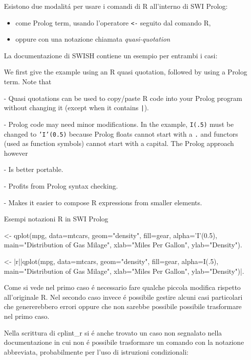 \documentclass[10pt,titlepage,twoside,a4paper]{report}
\newenvironment{code}{\singlespacing\captionsetup{type=listing}}{}
\begin{document}
Esistono due modalit\'a per usare i comandi di R all'interno di SWI Prolog:
\begin{itemize}
    \item come Prolog term, usando l'operatore \texttt{<-} seguito dal comando R,
    \item oppure con una notazione chiamata \emph{quasi-quotation}
\end{itemize}
La documentazione di SWISH contiene un esempio per entrambi i 
casi\cite{rprolognotations}:
\begin{displayquote}
[..] We first give the example using an R quasi quotation, followed by 
using a Prolog term.  Note that

  - Quasi quotations can be used to copy/paste R code into your Prolog
    program without changing it (except when it contains \texttt{|{\textbraceright}}).

  - Prolog code may need minor modifications.  In the example, \texttt{I(.5)}
    must be changed to \texttt{'I'(0.5)} because Prolog floats cannot start with
    a \texttt{.} and functors (used as function symbols) cannot start with a
    capital.  The Prolog approach however

    - Is better portable.

    - Profits from Prolog syntax checking.

    - Makes it easier to compose R expressions from smaller elements.
\end{displayquote}

\begin{code}
    \caption{Esempi notazioni R in SWI Prolog}
    \begin{prologcode*}{}
<- qplot(mpg, data=mtcars, geom="density", fill=gear, alpha='I'(0.5), main="Distribution of Gas Milage", xlab="Miles Per Gallon", ylab="Density").

<- {|r||qplot(mpg, data=mtcars, geom="density", fill=gear, alpha=I(.5), main="Distribution of Gas Milage", xlab="Miles Per Gallon", ylab="Density")|}.
    \end{prologcode*}
\end{code}

Come si vede nel primo caso \'e necessario fare qualche piccola modifica 
rispetto all'originale R. Nel secondo caso invece \'e possibile gestire alcuni 
casi particolari che genererebbero errori oppure che non sarebbe possibile 
possibile trasformare nel primo caso.

Nella scrittura di cplint\_r si \'e anche trovato un caso non segnalato nella 
documentazione in cui non \'e possibile trasformare un comando con la 
notazione abbreviata, probabilmente per l'uso di istruzioni condizionali:
\end{document}

